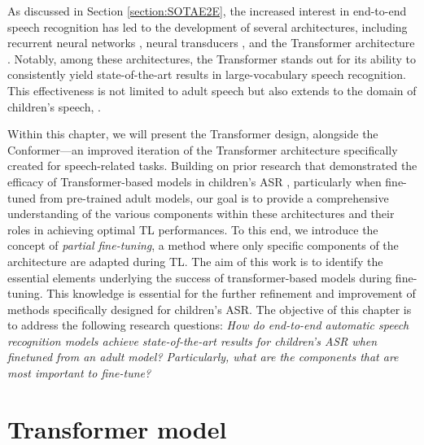 As discussed in Section \ref{section:SOTAE2E}, the increased interest in end-to-end speech recognition has led to the development of several architectures, including recurrent neural networks \cite{soltau2016neural}, neural transducers \cite{battenberg2017exploring}, and the Transformer architecture \cite{vaswani2017attention}. Notably, among these architectures, the Transformer stands out for its ability to consistently yield state-of-the-art results in large-vocabulary speech recognition. This effectiveness is not limited to adult speech but also extends to the domain of children's speech, \cite{gelin2021endtoend}. %



Within this chapter, we will present the Transformer design, alongside the Conformer—an improved iteration of the Transformer architecture specifically created for speech-related tasks. Building on prior research that demonstrated the efficacy of Transformer-based models in children's \ac{ASR} \cite{gelin2021endtoend}, particularly when fine-tuned from pre-trained adult models, our goal is to provide a comprehensive understanding of the various components within these architectures and their roles in achieving optimal \ac{TL} performances. To this end, we introduce the concept of \textit{partial fine-tuning}, a method where only specific components of the architecture are adapted during \ac{TL}. The aim of this work is to identify the essential elements underlying the success of transformer-based models during fine-tuning. This knowledge is essential for the further refinement and improvement of methods specifically designed for children's \ac{ASR}. The objective of this chapter is to address the following research questions: \textit{How do end-to-end automatic speech recognition models achieve state-of-the-art results for children's ASR when finetuned from an adult model?  Particularly, what are the components that are most important to fine-tune?}
\section{Transformer model}
\label{sec:trans_archi}

